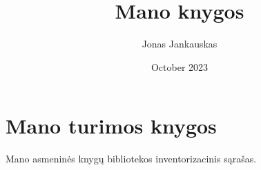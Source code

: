 \documentclass{article}
\title{Mano knygos}
\author{Jonas Jankauskas}
\date{October 2023}
\begin{document}
\maketitle

\section{Mano turimos knygos}

Mano asmeninės knygų bibliotekos inventorizacinis sąrašas.
\end{document}
